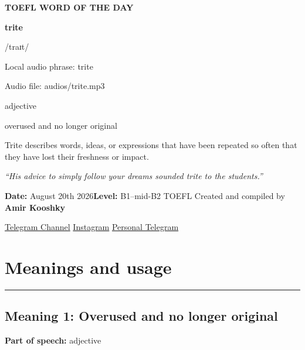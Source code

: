 \documentclass[11pt]{article}
\newcommand{\sectionrule}{\par\vspace{-0.5em}\noindent\textcolor{Accent}{\rule{\linewidth}{0.6pt}}\par}
\begin{document}
\begin{center}
{\sffamily\bfseries\color{Accent} TOEFL WORD OF THE DAY\par}
\vspace{8mm}
{\fontsize{42}{48}\selectfont\bfseries trite\par}
\vspace{2mm}
{\Large\sffamily\color{Accent} /traɪt/\par}
\vspace{2mm}
{\small\sffamily Local audio phrase: trite\par}
{\small\sffamily Audio file: audios/trite.mp3\par}
\vspace{2mm}
{\large\sffamily\color{Muted} adjective\par}
\vspace{5mm}
{\sffamily overused and no longer original\par}
\vspace{6mm}
{\large Trite describes words, ideas, or expressions that have been repeated so often that they have lost their freshness or impact.\par}
\vspace{6mm}
\begin{minipage}{0.84\textwidth}
\itshape “His advice to simply follow your dreams sounded trite to the students.”
\end{minipage}\par
\vspace{10mm}
\textbf{Date:} August 20th 2026\quad\textbullet\quad \textbf{Level:} B1--mid-B2 TOEFL
\vfill
Created and compiled by \textbf{Amir Kooshky}\par
\vspace{2mm}
\href{https://t.me/KooshkyTOEFL}{Telegram Channel}\quad\textbullet\quad
\href{https://www.instagram.com/kooshkytoefl}{Instagram}\quad\textbullet\quad
\href{https://t.me/KooshkyTOEFL\_pv}{Personal Telegram}
\end{center}
\newpage
\tableofcontents
\newpage

\section{Meanings and usage}
\sectionrule
\subsection{Meaning 1: Overused and no longer original}
\textbf{Part of speech:} adjective
\end{document}
